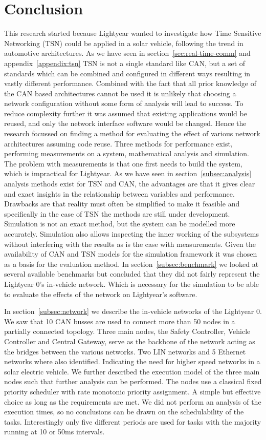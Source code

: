 \section{Conclusion}
\label{sec:conclusion}
This research started because Lightyear wanted to investigate how Time Sensitive Networking (TSN) could be applied in a solar vehicle, following the trend in automotive architectures. As we have seen in section~\ref{sec:real-time-comm} and appendix~\ref{appendix:tsn} TSN is not a single standard like CAN, but a set of standards which can be combined and configured in different ways resulting in vastly different performance. Combined with the fact that all prior knowledge of the CAN based architectures cannot be used it is unlikely that choosing a network configuration without some form of analysis will lead to success. To reduce complexity further it was assumed that existing applications would be reused, and only the network interface software would be changed. Hence the research focussed on finding a method for evaluating the effect of various network architectures assuming code reuse. Three methods for performance exist, performing measurements on a system, mathematical analysis and simulation. The problem with measurements is that one first needs to build the system, which is impractical for Lightyear. As we have seen in section~\ref{subsec:analysis} analysis methods exist for TSN and CAN, the advantages are that it gives clear and exact insights in the relationship between variables and performance. Drawbacks are that reality must often be simplified to make it feasible and specifically in the case of TSN the methods are still under development. Simulation is not an exact method, but the system can be modelled more accurately. Simulation also allows inspecting the inner working of the subsystems without interfering with the results as is the case with measurements. Given the availability of CAN and TSN models for the \omnet simulation framework it was chosen as a basis for the evaluation method. In section~\ref{subsec:benchmark} we looked at several available benchmarks but concluded that they did not fairly represent the Lightyear 0's in-vehicle network. Which is necessary for the simulation to be able to evaluate the effects of the network on Lightyear's software.

In section~\ref{subsec:network} we describe the in-vehicle networks of the Lightyear 0. We saw that 10 CAN busses are used to connect more than 50 nodes in a partially connected topology. Three main nodes, the Safety Controller, Vehicle Controller and Central Gateway, serve as the backbone of the network acting as the bridges between the various networks. Two LIN networks and 5 Ethernet networks where also identified. Indicating the need for higher speed networks in a solar electric vehicle. We further described the execution model of the three main nodes such that further analysis can be performed. The nodes use a classical fixed priority scheduler with rate monotonic priority assignment. A simple but effective choice as long as the requirements are met. We did not perform an analysis of the execution times, so no conclusions can be drawn on the schedulability of the tasks. Interestingly only five different periods are used for tasks with the majority running at 10 or 50ms intervals.

